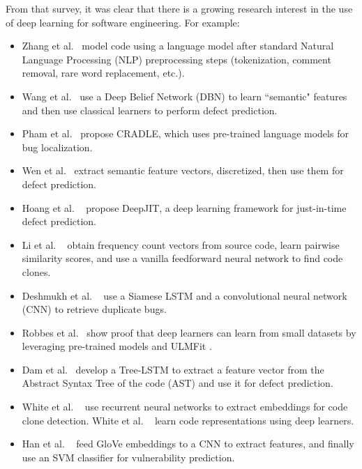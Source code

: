 \documentclass[10pt,compsoc,twocolumn]{IEEEtran}
\newcommand{\bi}{\begin{itemize}}
\newcommand{\ei}{\end{itemize}}
\begin{document}
From that survey, it was clear that 
there is   a growing research interest in the use of deep learning for software engineering. For example:
\bi
\item
Zhang et al.~\cite{zhang2018neural} model code using a language model after standard Natural Language Processing (NLP) preprocessing steps (tokenization, comment removal, rare word replacement, etc.).
\item
 Wang et al.~\cite{wang2018deep,wang2016automatically} use a Deep Belief Network (DBN) to learn ``semantic" features and then use classical learners to perform defect prediction.
 \item
 Pham et al.~\cite{pham2019cradle} propose CRADLE, which uses pre-trained language models for bug localization.
 \item
 Wen et al.~\cite{wen2018well} extract semantic feature vectors,  discretized, then use 
 them for defect prediction.
\item
Hoang et al. ~\cite{hoang2019deepjit} propose DeepJIT, a deep learning framework for just-in-time defect prediction.
\item
Li et al. ~\cite{li2017cclearner} obtain frequency count vectors from source code, learn pairwise similarity scores, and use a vanilla feedforward neural network to find code clones. \item
Deshmukh et al. ~\cite{deshmukh2017towards} use a Siamese LSTM \cite{koch2015siamese} and a convolutional neural network (CNN) to retrieve duplicate
bugs.
\item
Robbes et al.~\cite{robbes2019leveraging} show proof that deep learners can learn from small datasets by leveraging pre-trained models and ULMFit \cite{howard2018universal}.
\item
Dam et al.~\cite{dam2019lessons} develop a Tree-LSTM \cite{tai2015improved} to extract a feature vector from the Abstract Syntax Tree of
 the code (AST) and use it for defect prediction. \item
 White et al. ~\cite{white2016deep} use recurrent neural networks to extract embeddings for
 code clone detection. White et al. ~\cite{white2015toward} learn code representations using deep learners.
 \item
 Han et al. ~\cite{han2017learning} feed GloVe \cite{pennington2014glove} embeddings to a CNN to extract features, and finally use an SVM classifier for vulnerability prediction.
 \ei
\end{document}
